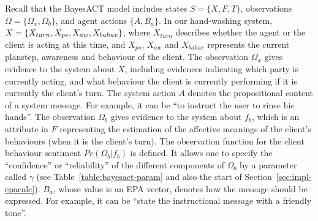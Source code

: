 Recall that the BayesACT model includes states $S = \{X, F, T\}$, observations $\Omega = \{\Omega_{x}, \Omega_{b}\}$, and agent actions $\{A, B_{a}\}$. In our hand-washing system, $X = \{X_{turn}, X_{ps}, X_{aw}, \\ X_{bahav}\}$, where $X_{turn}$ describes whether the agent or the client is acting at this time, and $X_{ps}$, $X_{aw}$ and $X_{bahav}$ represents the current planstep, awareness and behaviour of the client. The observation $\Omega_{x}$ gives evidence to the system about $X$, including evidences indicating which party is currently acting, and what behaviour the client is currently performing if it is currently the client's turn. The system action $A$ denotes the propositional content of a system message. For example, it can be ``to instruct the user to rinse his hands''. The observation $\Omega_{b}$ gives evidence to the system about $f_b$, which is an attribute in $F$ representing the estimation of the affective meanings of the client's behaviours (when it is the client's turn). The observation function for the client behaviour sentiment $Pr(\Omega_b|f_b)$ is defined. It allows one to specify the ``confidence'' or ``reliability'' of the different components of $\Omega_b$ by a parameter called $\gamma$ (see Table~\ref{table:bayesact-param} and also the start of Section~\ref{sec:impl-epacalc}). $B_{a}$, whose value is an EPA vector, denotes how the message should be expressed. For example, it can be ``state the instructional message with a friendly tone''. 

